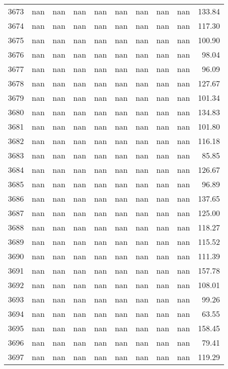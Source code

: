 \begin{tabular}{lrrrrrrrrr}
3673 & nan & nan & nan & nan & nan & nan & nan & nan & 133.84 \\
3674 & nan & nan & nan & nan & nan & nan & nan & nan & 117.30 \\
3675 & nan & nan & nan & nan & nan & nan & nan & nan & 100.90 \\
3676 & nan & nan & nan & nan & nan & nan & nan & nan & 98.04 \\
3677 & nan & nan & nan & nan & nan & nan & nan & nan & 96.09 \\
3678 & nan & nan & nan & nan & nan & nan & nan & nan & 127.67 \\
3679 & nan & nan & nan & nan & nan & nan & nan & nan & 101.34 \\
3680 & nan & nan & nan & nan & nan & nan & nan & nan & 134.83 \\
3681 & nan & nan & nan & nan & nan & nan & nan & nan & 101.80 \\
3682 & nan & nan & nan & nan & nan & nan & nan & nan & 116.18 \\
3683 & nan & nan & nan & nan & nan & nan & nan & nan & 85.85 \\
3684 & nan & nan & nan & nan & nan & nan & nan & nan & 126.67 \\
3685 & nan & nan & nan & nan & nan & nan & nan & nan & 96.89 \\
3686 & nan & nan & nan & nan & nan & nan & nan & nan & 137.65 \\
3687 & nan & nan & nan & nan & nan & nan & nan & nan & 125.00 \\
3688 & nan & nan & nan & nan & nan & nan & nan & nan & 118.27 \\
3689 & nan & nan & nan & nan & nan & nan & nan & nan & 115.52 \\
3690 & nan & nan & nan & nan & nan & nan & nan & nan & 111.39 \\
3691 & nan & nan & nan & nan & nan & nan & nan & nan & 157.78 \\
3692 & nan & nan & nan & nan & nan & nan & nan & nan & 108.01 \\
3693 & nan & nan & nan & nan & nan & nan & nan & nan & 99.26 \\
3694 & nan & nan & nan & nan & nan & nan & nan & nan & 63.55 \\
3695 & nan & nan & nan & nan & nan & nan & nan & nan & 158.45 \\
3696 & nan & nan & nan & nan & nan & nan & nan & nan & 79.41 \\
3697 & nan & nan & nan & nan & nan & nan & nan & nan & 119.29 \\

\end{tabular}
